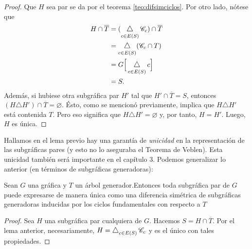  \begin{proof}
 Que $H$ sea par se da por el teorema \ref{teo:difsimciclos}. Por otro lado, nótese que
\begin{align*}
    H \cap \overline{T} &=(\difsym_{c \in E(S)} \mathscr{C}_{c}) \cap \overline{T} \\
             &=\difsym_{c \in E(S)} (\mathscr{C}_{c} \cap T) \\
             &=G\Big[\difsym_{c\in E(S)} c\Big] \\
             &= S.
\end{align*}
Además, si hubiese otra subgráfica par $H'$ tal que $H' \cap \overline{T}= S$, entonces $(H \triangle H') \cap \overline{T} = \varnothing$. Ésto, como se mencionó previamente, implica que  $H\triangle H' $ está contenida $T$. Pero eso significa que $H\triangle H' = \varnothing$ y, por tanto, $H = H'$. Luego, $H$ es única.
 \end{proof}

Hallamos en el lema previo hay una garantía de \textit{unicidad} en la representación de las subgráficas pares (y esto no lo aseguraba el Teorema de Veblen). Esta unicidad también será importante en el capítulo 3. Podemos generalizar lo anterior (en términos de subgráficas generadoras): 

 \begin{teo} \label{cor:baseciclosfundamentales}
Sean $G$ una gráfica y $T$ un árbol generador.Entonces toda subgráfica par de $G$ puede expresarse de manera única como una diferencia simétrica de subgráficas generadoras inducidas por los ciclos fundamentales con respecto a $T$  
 \end{teo}
 
 \begin{proof}
 Sea $H$ una subgráfica par cualquiera de $G$. Hacemos $S= H \cap \overline{T}$. Por el lema anterior, necesariamente, $H = \difsym_{c \in E(S)} \mathscr{C}_{c}$ y es el único con tales propiedades. 
 
 \end{proof}
 
